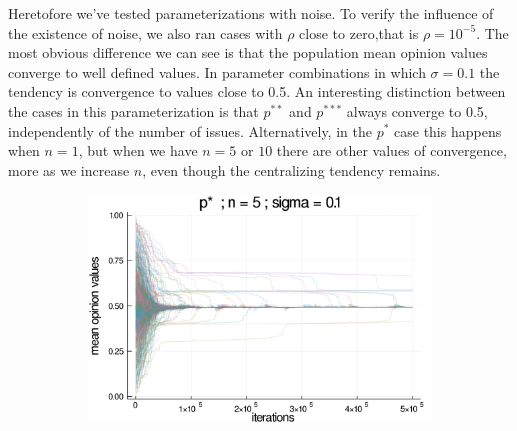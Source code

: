 \documentclass{article}
\begin{document}
{    Heretofore we've tested parameterizations with noise. To verify the
    influence of the existence of noise, we also ran cases with \(\rho\) close to
    zero,that is \(\rho = 10^{-5} \). The most obvious difference we can see is
    that the population mean opinion values converge to well defined values. In
    parameter combinations in which \(\sigma = 0.1\) the tendency is convergence
    to values close to 0.5. An interesting distinction between the cases in this
    parameterization is that \(p^{**}\) and \(p^{***}\) always converge to 0.5,
    independently of the number of issues. Alternatively, in the \(p^{*}\) case
    this happens when \(n=1\), but when we have \(n=5\) or \(10\) there are
    other values of convergence, more as we increase \(n\), even though the
    centralizing tendency remains.
    \begin{figure}[H]
      \centering
      \begin{subfigure}[b]{0.48\textwidth}
        \includegraphics[width=\textwidth]{img/series/tseries4/Poodlcalculatepsn5-rho10e-5-sigma01-00intransrandom.png}
      \end{subfigure}
      \begin{subfigure}[b]{0.48\textwidth}

\end{subfigure}
\end{figure}}
\end{document}
